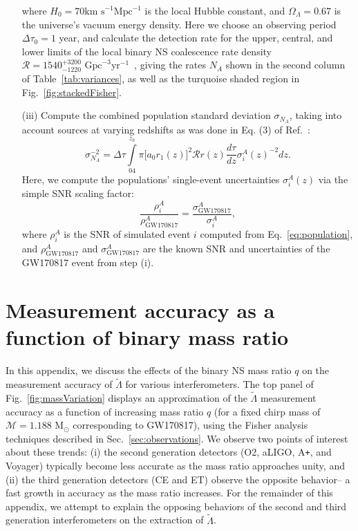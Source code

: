 \documentclass[prd,twocolumn,nofootinbib,superscriptaddress,amsmath,amssymb]{revtex4-1}
\begin{document}
\begin{enumerate}
where $H_0 = 70 \text{km s}^{-1}\text{Mpc}^{-1}$ is the local Hubble constant, and $\Omega_{\Lambda}=0.67$ is the universe's vacuum energy density.
Here we choose an observing period $\Delta \tau_0 = 1$ year, and calculate the detection rate for the upper, central, and lower limits of the local binary NS coalescence rate density $\mathcal{R}=1540^{+3200}_{-1220} \text{ Gpc}^{-3}\text{yr}^{-1}$~\cite{Abbott2017}, giving the rates $N_A$ shown in the second column of Table~\ref{tab:variances}, as well as the turquoise shaded region in Fig.~\ref{fig:stackedFisher}.

\item[(iii)] Compute the combined population standard deviation $\sigma_{N_A}$, taking into account sources at varying redshifts as was done in Eq. (3) of Ref.~\cite{Takahiro}:
\begin{equation}
\sigma_{N_A}^{-2}=\Delta \tau \int\limits^{z_h}_04 \pi \lbrack a_0 r_1(z)\rbrack^2 \mathcal{R}r(z)\frac{d\tau}{dz}\sigma^A_i(z)^{-2}dz.
\end{equation}
Here, we compute the populations' single-event uncertainties $\sigma_i^A(z)$ via the simple SNR scaling factor: 
\begin{equation}
\frac{\rho_i^A}{\rho_{\text{GW170817}}^A} = \frac{\sigma_{\text{GW170817}}^A}{\sigma_i^A},
\end{equation}
where $\rho_i^A$ is the SNR of simulated event $i$ computed from Eq.~\ref{eq:population}, and $\rho_{\text{GW170817}}^A$ and $\sigma_{\text{GW170817}}^A$ are the known SNR and uncertainties of the GW170817 event from step (i).
\end{enumerate}

\section{Measurement accuracy as a function of binary mass ratio}\label{app:measurement}
In this appendix, we discuss the effects of the binary NS mass ratio $q$ on the measurement accuracy of $\tilde\Lambda$ for various interferometers. 
The top panel of Fig.~\ref{fig:massVariation} displays an approximation of the $\tilde\Lambda$ measurement accuracy as a function of increasing mass ratio $q$ (for a fixed chirp mass of $\mathcal{M}=1.188 \text{ M}_{\odot}$ corresponding to GW170817), using the Fisher analysis techniques described in Sec.~\ref{sec:observations}.
We observe two points of interest about these trends: (i) the second generation detectors (O2, aLIGO, A\texttt{+}, and Voyager) typically become less accurate as the mass ratio approaches unity, and (ii) the third generation detectors (CE and ET) observe the opposite behavior-- a fast growth in accuracy as the mass ratio increases.
For the remainder of this appendix, we attempt to explain the opposing behaviors of the second and third generation interferometers on the extraction of $\tilde\Lambda$.
\end{document}
